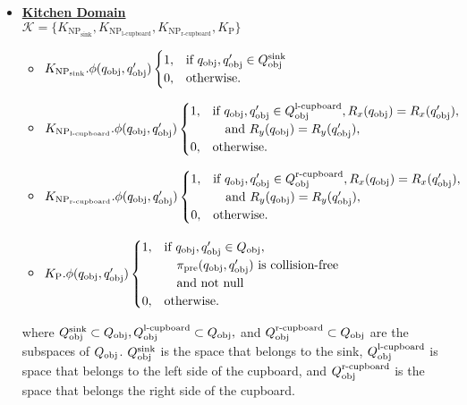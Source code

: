 \begin{definition}
\begin{itemize}
        \item \underline{\textbf{Kitchen Domain}} \\ $\mathcal{K}=\{K_{\text{NP}_\text{sink}},K_{\text{NP}_\text{l-cupboard}},K_{\text{NP}_\text{r-cupboard}},K_{\text{P}}\}$
            \begin{itemize}
                \item \(K_{\text{NP}_\text{sink}}.\phi(q_\text{obj}, q'_\text{obj})  \\
                \begin{cases} 
                1, & \text{if } q_\text{obj}, q'_\text{obj} \in Q_\text{obj}^\text{sink} \\ 
                0, & \text{otherwise.} 
                \end{cases}\)
                \item \(K_{\text{NP}_\text{l-cupboard}}.\phi(q_\text{obj}, q'_\text{obj}) \\
                \begin{cases} 
                1, & \text{if } q_\text{obj}, q'_\text{obj} \in Q_\text{obj}^\text{l-cupboard}, R_x(q_\text{obj}) = R_x(q'_\text{obj}), \\ 
                & \quad \text{and } R_y(q_\text{obj}) = R_y(q'_\text{obj}), \\ 
                0, & \text{otherwise.} 
                \end{cases}\)
                \item \(K_{\text{NP}_\text{r-cupboard}}.\phi(q_\text{obj}, q'_\text{obj}) \\
                \begin{cases} 
                1, & \text{if } q_\text{obj}, q'_\text{obj} \in Q_\text{obj}^\text{r-cupboard}, R_x(q_\text{obj}) = R_x(q'_\text{obj}), \\ 
                & \quad \text{and } R_y(q_\text{obj}) = R_y(q'_\text{obj}), \\ 
                0, & \text{otherwise.} 
                \end{cases}\)
                \item \(K_{\text{P}}.\phi(q_\text{obj}, q'_\text{obj}) \\
                \begin{cases} 
                1, & \text{if } q_\text{obj}, q'_\text{obj} \in Q_\text{obj}, \\
                &\quad \pi_\text{pre}(q_\text{obj}, q'_\text{obj}) \text{ is collision-free} \\
                & \quad \text{and not null} \\ 
                0, & \text{otherwise.} 
                \end{cases}\)
            \end{itemize}
        where $Q_\text{obj}^\text{sink} \subset Q_\text{obj}, Q_\text{obj}^\text{l-cupboard} \subset Q_\text{obj},$ and $Q_\text{obj}^\text{r-cupboard} \subset Q_\text{obj}$ are the subspaces of $Q_\text{obj}$. $Q_\text{obj}^\text{sink}$ is the space that belongs to the sink, $Q_\text{obj}^\text{l-cupboard}$ is space that belongs to the left side of the cupboard, and $Q_\text{obj}^\text{r-cupboard}$ is the space that belongs the right side of the cupboard.
    \end{itemize}


\end{definition}
